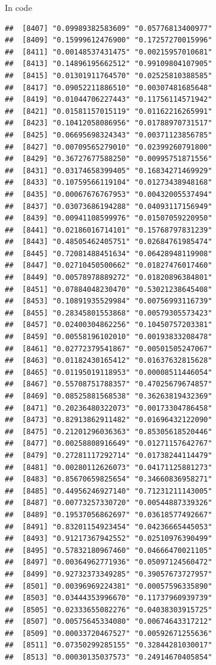 \documentclass[ignorenonframetext,]{beamer}
\begin{document}
\begin{frame}[fragile]{In code}
\begin{verbatim}
##  [8407] "0.09989382583609" "0.05776813400977"
##  [8409] "0.15999612476900" "0.17257270015996"
##  [8411] "0.00148537431475" "0.00215957010681"
##  [8413] "0.14896195662512" "0.99109804107905"
##  [8415] "0.01301911764570" "0.02525810388585"
##  [8417] "0.09052211886510" "0.00307481685648"
##  [8419] "0.01044706227443" "0.11756114571942"
##  [8421] "0.01581157015119" "0.01162216265991"
##  [8423] "0.10412058086956" "0.01788970731517"
##  [8425] "0.06695698324343" "0.00371123856785"
##  [8427] "0.00709565279010" "0.02399260791800"
##  [8429] "0.36727677588250" "0.00995751871556"
##  [8431] "0.03174658399405" "0.16834271469929"
##  [8433] "0.10759566119104" "0.01273438948168"
##  [8435] "0.00067676767953" "0.00432005537494"
##  [8437] "0.03073686194288" "0.04093117156949"
##  [8439] "0.00941108599976" "0.01507059220950"
##  [8441] "0.02186016714101" "0.15768797831239"
##  [8443] "0.48505462405751" "0.02684761985474"
##  [8445] "0.72081488451634" "0.06428948119908"
##  [8447] "0.02710450500662" "0.01827476017460"
##  [8449] "0.00578978889272" "0.01820896384801"
##  [8451] "0.07884048230470" "0.53021238645408"
##  [8453] "0.10891935529984" "0.00756993116739"
##  [8455] "0.28345801553868" "0.00579305573423"
##  [8457] "0.02400304862256" "0.10450757203381"
##  [8459] "0.00558196102010" "0.00193833208478"
##  [8461] "0.02772379541867" "0.00501505247067"
##  [8463] "0.01182430165412" "0.01637632815628"
##  [8465] "0.01195019118953" "0.00008511446054"
##  [8467] "0.55708751788357" "0.47025679674857"
##  [8469] "0.08525881568538" "0.36263819432369"
##  [8471] "0.20236480322073" "0.00173304786458"
##  [8473] "0.82913862911482" "0.01696432122090"
##  [8475] "0.21201296036363" "0.85305618520446"
##  [8477] "0.00258808916649" "0.01271157642767"
##  [8479] "0.27281117292714" "0.01738244114479"
##  [8481] "0.00280112626073" "0.04171125881273"
##  [8483] "0.85670659825654" "0.34660836958271"
##  [8485] "0.44956246927140" "0.71231211143005"
##  [8487] "0.00773257330720" "0.00544887339326"
##  [8489] "0.19537056862697" "0.03618577492667"
##  [8491] "0.83201154923454" "0.04236665445053"
##  [8493] "0.91217367942552" "0.02510976390499"
##  [8495] "0.57832180967460" "0.04666470021105"
##  [8497] "0.00364962771936" "0.05097124560472"
##  [8499] "0.92732373349285" "0.39057673727957"
##  [8501] "0.00396969224381" "0.00057596335890"
##  [8503] "0.03444353996670" "0.11737960939739"
##  [8505] "0.02333655082276" "0.04038303915725"
##  [8507] "0.00575645334080" "0.00674643317212"
##  [8509] "0.00033720467527" "0.00592671255636"
##  [8511] "0.07350299285155" "0.32844281030017"
##  [8513] "0.00030135037573" "0.24914670405854"

\end{verbatim}
\end{frame}
\end{document}
